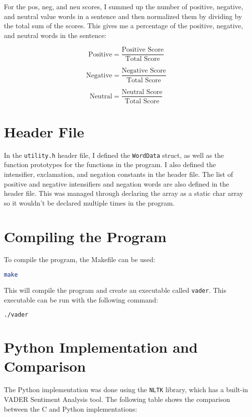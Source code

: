\documentclass[12pt]{article}
\begin{document}
For the pos, neg, and neu scores, I summed up the number of positive, negative, and neutral value words in a sentence and then normalized them by dividing by the total sum of the scores.
This gives me a percentage of the positive, negative, and neutral words in the sentence:

\[ \text{Positive} = \frac{\text{Positive Score}}{\text{Total Score}} \]

\[ \text{Negative} = \frac{\text{Negative Score}}{\text{Total Score}} \]

\[ \text{Neutral} = \frac{\text{Neutral Score}}{\text{Total Score}} \]

\section{Header File}

In the \texttt{utility.h} header file, I defined the \texttt{WordData} struct, as well as the function prototypes for the functions in the program.
I also defined the intensifier, exclamation, and negation constants in the header file.
The list of positive and negative intensifiers and negation words are also defined in the header file.
This was managed through declaring the array as a static char array so it wouldn't be declared multiple times in the program.

\section{Compiling the Program}

To compile the program, the Makefile can be used:

\begin{lstlisting}[language=bash]
make
\end{lstlisting}

This will compile the program and create an executable called \texttt{vader}.
This executable can be run with the following command:

\begin{lstlisting}[language=bash]
./vader
\end{lstlisting}

\section{Python Implementation and Comparison}

The Python implementation was done using the \texttt{NLTK} library, which has a built-in VADER Sentiment Analysis tool.
The following table shows the comparison between the C and Python implementations:
\end{document}
